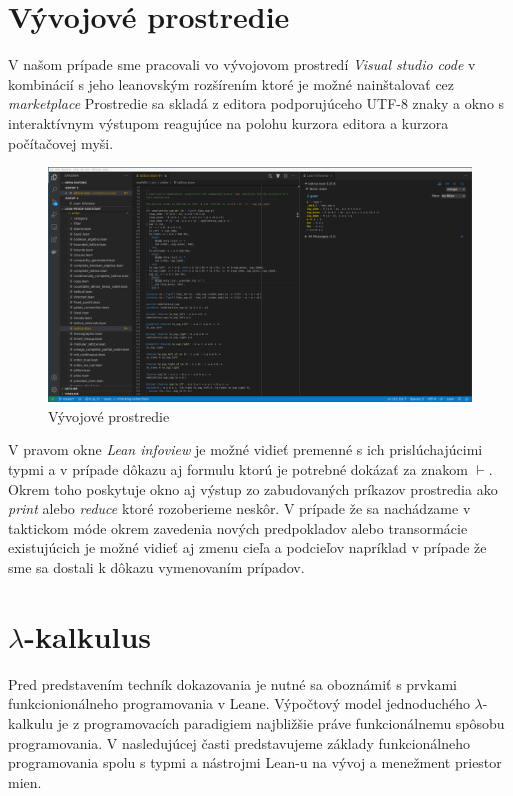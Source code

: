 \documentclass[a4paper,10pt,oneside]{report}%
\begin{document}
\section{Vývojové prostredie}
    V našom prípade sme pracovali vo vývojovom prostredí \emph{Visual studio code}
v kombinácií s jeho leanovským rozšírením ktoré je možné nainštalovať cez
\emph{marketplace} Prostredie sa skladá z editora podporujúceho UTF-8 znaky a okno
s interaktívnym výstupom reagujúce na polohu kurzora editora a kurzora počítačovej
myši.
\begin{center}
    \begin{figure}[!ht]
        \centering
        \includegraphics[scale=0.25]{vscode_printscreen.png}
        \caption{Vývojové prostredie}
    \end{figure}
\end{center}
    V pravom okne \emph{Lean infoview} je možné vidieť premenné s ich prislúchajúcimi
typmi a v prípade dôkazu aj formulu ktorú je potrebné dokázať za znakom $\vdash$.
    Okrem toho poskytuje okno aj výstup zo zabudovaných príkazov prostredia
ako \emph{print} alebo \emph{reduce} ktoré rozoberieme neskôr.
    V prípade že sa nachádzame v taktickom móde okrem zavedenia nových predpokladov
alebo transormácie existujúcich je možné vidieť aj zmenu cieľa a podcieľov
napríklad v prípade že sme sa dostali k dôkazu vymenovaním prípadov.
\section{$\lambda$-kalkulus}
    Pred predstavením techník dokazovania je nutné sa oboznámiť s prvkami funkcionionálneho
programovania v Leane.
    Výpočtový model jednoduchého $\lambda$-kalkulu je z programovacích paradigiem najbližšie
práve funkcionálnemu spôsobu programovania.
V nasledujúcej časti predstavujeme základy funkcionálneho programovania spolu
    s typmi a nástrojmi Lean-u na vývoj a menežment priestor mien.
\end{document}
